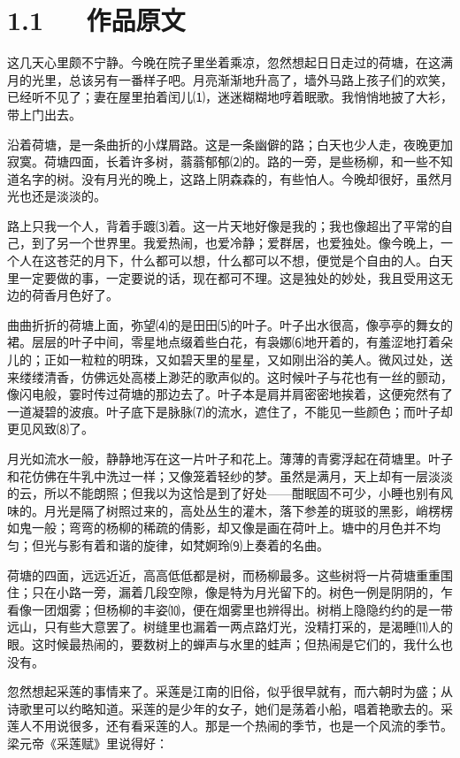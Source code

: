 \documentclass[letterpaper,10pt,english]{sphinxmanual}
\begin{document}
\section{1.1   作品原文}
\label{\detokenize{p01_u6563_u6587/_u6731_u81ea_u6e05-_u8377_u5858_u6708_u8272:id3}}
这几天心里颇不宁静。今晚在院子里坐着乘凉，忽然想起日日走过的荷塘，在这满月的光里，总该另有一番样子吧。月亮渐渐地升高了，墙外马路上孩子们的欢笑，已经听不见了；妻在屋里拍着闰儿⑴，迷迷糊糊地哼着眠歌。我悄悄地披了大衫，带上门出去。

沿着荷塘，是一条曲折的小煤屑路。这是一条幽僻的路；白天也少人走，夜晚更加寂寞。荷塘四面，长着许多树，蓊蓊郁郁⑵的。路的一旁，是些杨柳，和一些不知道名字的树。没有月光的晚上，这路上阴森森的，有些怕人。今晚却很好，虽然月光也还是淡淡的。

路上只我一个人，背着手踱⑶着。这一片天地好像是我的；我也像超出了平常的自己，到了另一个世界里。我爱热闹，也爱冷静；爱群居，也爱独处。像今晚上，一个人在这苍茫的月下，什么都可以想，什么都可以不想，便觉是个自由的人。白天里一定要做的事，一定要说的话，现在都可不理。这是独处的妙处，我且受用这无边的荷香月色好了。

曲曲折折的荷塘上面，弥望⑷的是田田⑸的叶子。叶子出水很高，像亭亭的舞女的裙。层层的叶子中间，零星地点缀着些白花，有袅娜⑹地开着的，有羞涩地打着朵儿的；正如一粒粒的明珠，又如碧天里的星星，又如刚出浴的美人。微风过处，送来缕缕清香，仿佛远处高楼上渺茫的歌声似的。这时候叶子与花也有一丝的颤动，像闪电般，霎时传过荷塘的那边去了。叶子本是肩并肩密密地挨着，这便宛然有了一道凝碧的波痕。叶子底下是脉脉⑺的流水，遮住了，不能见一些颜色；而叶子却更见风致⑻了。

月光如流水一般，静静地泻在这一片叶子和花上。薄薄的青雾浮起在荷塘里。叶子和花仿佛在牛乳中洗过一样；又像笼着轻纱的梦。虽然是满月，天上却有一层淡淡的云，所以不能朗照；但我以为这恰是到了好处——酣眠固不可少，小睡也别有风味的。月光是隔了树照过来的，高处丛生的灌木，落下参差的斑驳的黑影，峭楞楞如鬼一般；弯弯的杨柳的稀疏的倩影，却又像是画在荷叶上。塘中的月色并不均匀；但光与影有着和谐的旋律，如梵婀玲⑼上奏着的名曲。

荷塘的四面，远远近近，高高低低都是树，而杨柳最多。这些树将一片荷塘重重围住；只在小路一旁，漏着几段空隙，像是特为月光留下的。树色一例是阴阴的，乍看像一团烟雾；但杨柳的丰姿⑽，便在烟雾里也辨得出。树梢上隐隐约约的是一带远山，只有些大意罢了。树缝里也漏着一两点路灯光，没精打采的，是渴睡⑾人的眼。这时候最热闹的，要数树上的蝉声与水里的蛙声；但热闹是它们的，我什么也没有。

忽然想起采莲的事情来了。采莲是江南的旧俗，似乎很早就有，而六朝时为盛；从诗歌里可以约略知道。采莲的是少年的女子，她们是荡着小船，唱着艳歌去的。采莲人不用说很多，还有看采莲的人。那是一个热闹的季节，也是一个风流的季节。梁元帝《采莲赋》里说得好：
\end{document}
